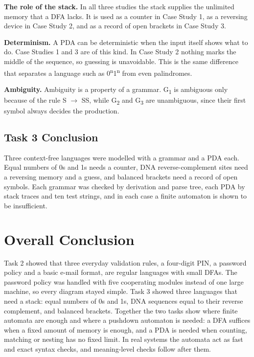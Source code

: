 \documentclass[12pt,a4paper]{article}
\begin{document}
\textbf{The role of the stack.} In all three studies the stack supplies the unlimited memory that a DFA lacks. It is used as a counter in Case Study 1, as a reversing device in Case Study 2, and as a record of open brackets in Case Study 3.

\textbf{Determinism.} A PDA can be deterministic when the input itself shows what to do. Case Studies 1 and 3 are of this kind. In Case Study 2 nothing marks the middle of the sequence, so guessing is unavoidable. This is the same difference that separates a language such as 0\textsuperscript{n}1\textsuperscript{n} from even palindromes.

\textbf{Ambiguity.} Ambiguity is a property of a grammar. G\textsubscript{1} is ambiguous only because of the rule S \ensuremath{\rightarrow} SS, while G\textsubscript{2} and G\textsubscript{3} are unambiguous, since their first symbol always decides the production.

\subsection{Task 3 Conclusion}

Three context-free languages were modelled with a grammar and a PDA each. Equal numbers of 0s and 1s needs a counter, DNA reverse-complement sites need a reversing memory and a guess, and balanced brackets need a record of open symbols. Each grammar was checked by derivation and parse tree, each PDA by stack traces and ten test strings, and in each case a finite automaton is shown to be insufficient.

\section{Overall Conclusion}

Task 2 showed that three everyday validation rules, a four-digit PIN, a password policy and a basic e-mail format, are regular languages with small DFAs. The password policy was handled with five cooperating modules instead of one large machine, so every diagram stayed simple. Task 3 showed three languages that need a stack: equal numbers of 0s and 1s, DNA sequences equal to their reverse complement, and balanced brackets. Together the two tasks show where finite automata are enough and where a pushdown automaton is needed: a DFA suffices when a fixed amount of memory is enough, and a PDA is needed when counting, matching or nesting has no fixed limit. In real systems the automata act as fast and exact syntax checks, and meaning-level checks follow after them.
\end{document}
